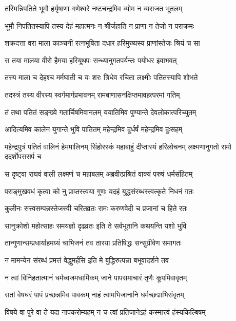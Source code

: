 \twolineshloka
{तस्मिन्निपतिते भूमौ हर्यृषाणां गणेश्वरे}
{नष्टचन्द्रमिव व्योम न व्यराजत भूतलम्} %

\twolineshloka
{भूमौ निपतितस्यापि तस्य देहं महात्मनः}
{न श्रीर्जहाति न प्राणा न तेजो न पराक्रमः} %

\twolineshloka
{शक्रदत्ता वरा माला काञ्चनी रत्नभूषिता}
{दधार हरिमुख्यस्य प्राणांस्तेजः श्रियं च सा} %

\twolineshloka
{स तया मालया वीरो हैमया हरियूथपः}
{सन्ध्यानुगतपर्यन्तः पयोधर इवाभवत्} %

\twolineshloka
{तस्य माला च देहश्च मर्मघाती च यः शरः}
{त्रिधेव रचिता लक्ष्मीः पतितस्यापि शोभते} %

\twolineshloka
{तदस्त्रं तस्य वीरस्य स्वर्गमार्गप्रभावनम्}
{रामबाणासनक्षिप्तमावहत्परमां गतिम्} %

\twolineshloka
{तं तथा पतितं सङ्ख्ये गतार्चिषमिवानलम्}
{ययातिमिव पुण्यान्ते देवलोकात्परिच्युतम्} %

\twolineshloka
{आदित्यमिव कालेन युगान्ते भुवि पातितम्}
{महेन्द्रमिव दुर्धर्षं महेन्द्रमिव दुःसहम्} %

\threelineshloka
{महेन्द्रपुत्रं पतितं वालिनं हेममालिनम्}
{सिंहोरस्कं महाबाहुं दीप्तास्यं हरिलोचनम्}
{लक्ष्मणानुगतो रामो ददर्शोपससर्प च} %

\twolineshloka
{स दृष्ट्वा राघवं वाली लक्ष्मणं च महाबलम्}
{अब्रवीत्प्रश्रितं वाक्यं परुषं धर्मसंहितम्} %

\twolineshloka
{पराङ्मुखवधं कृत्वा को नु प्राप्तस्त्वया गुणः}
{यदहं युद्धसंरब्धस्त्वत्कृते निधनं गतः} %

\twolineshloka
{कुलीनः सत्त्वसम्पन्नस्तेजस्वी चरितव्रतः}
{रामः करुणवेदी च प्रजानां च हिते रतः} %

\twolineshloka
{सानुक्रोशो महोत्साहः समयज्ञो दृढव्रतः}
{इति ते सर्वभूतानि कथयन्ति यशो भुवि} %

\twolineshloka
{तान्गुणान्सम्प्रधार्याहमग्र्यं चाभिजनं तव}
{तारया प्रतिषिद्धः सन्सुग्रीवेण समागतः} %

\twolineshloka
{न मामन्येन संरब्धं प्रमत्तं वेद्धुमर्हसि}
{इति मे बुद्धिरुत्पन्ना बभूवादर्शने तव} %

\twolineshloka
{न त्वां विनिहतात्मानं धर्मध्वजमधार्मिकम्}
{जाने पापसमाचारं तृणैः कूपमिवावृतम्} %

\twolineshloka
{सतां वेषधरं पापं प्रच्छन्नमिव पावकम्}
{नाहं त्वामभिजानानि धर्मच्छद्माभिसंवृतम्} %

\twolineshloka
{विषये वा पुरे वा ते यदा नापकरोम्यहम्}
{न च त्वां प्रतिजानेऽहं कस्मात्त्वं हंस्यकिल्बिषम्} %

